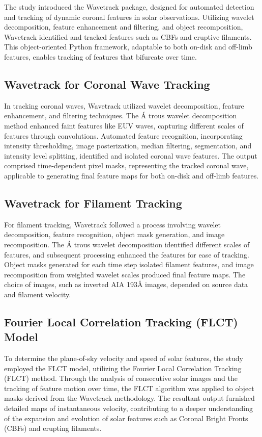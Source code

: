 The study introduced the Wavetrack package, designed for automated detection and tracking of dynamic coronal features in solar observations. Utilizing wavelet decomposition, feature enhancement and filtering, and object recomposition, Wavetrack identified and tracked features such as CBFs and eruptive filaments. This object-oriented Python framework, adaptable to both on-disk and off-limb features, enables tracking of features that bifurcate over time.

\subsection{Wavetrack for Coronal Wave Tracking}
In tracking coronal waves, Wavetrack utilized wavelet decomposition, feature enhancement, and filtering techniques. The \'A trous wavelet decomposition method enhanced faint features like EUV waves, capturing different scales of features through convolutions. Automated feature recognition, incorporating intensity thresholding, image posterization, median filtering, segmentation, and intensity level splitting, identified and isolated coronal wave features. The output comprised time-dependent pixel masks, representing the tracked coronal wave, applicable to generating final feature maps for both on-disk and off-limb features.

\subsection{Wavetrack for Filament Tracking}
For filament tracking, Wavetrack followed a process involving wavelet decomposition, feature recognition, object mask generation, and image recomposition. The \'A trous wavelet decomposition identified different scales of features, and subsequent processing enhanced the features for ease of tracking. Object masks generated for each time step isolated filament features, and image recomposition from weighted wavelet scales produced final feature maps. The choice of images, such as inverted AIA 193Å images, depended on source data and filament velocity.

\subsection{Fourier Local Correlation Tracking (FLCT) Model}
To determine the plane-of-sky velocity and speed of solar features, the study employed the FLCT model, utilizing the Fourier Local Correlation Tracking (FLCT) method. Through the analysis of consecutive solar images and the tracking of feature motion over time, the FLCT algorithm was applied to object masks derived from the Wavetrack methodology. The resultant output furnished detailed maps of instantaneous velocity, contributing to a deeper understanding of the expansion and evolution of solar features such as Coronal Bright Fronts (CBFs) and erupting filaments.

